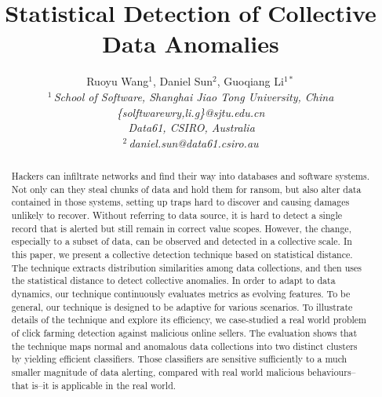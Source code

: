 \documentclass[10pt,conference,letterpaper]{IEEEtran}
\title{Statistical Detection of Collective Data Anomalies}
\author{%
	{Ruoyu Wang{\small$^{1}$}, Daniel Sun{\small$^{2}$}, Guoqiang Li{\small$^{1*}$} }%
	\vspace{1.6mm}\\
	\fontsize{10}{10}\selectfont\itshape
	$^{1}$\,School of Software, Shanghai Jiao Tong University, China\\
	\fontsize{9}{9}\selectfont\ttfamily\upshape
	\{solftwarewry,li.g\}@sjtu.edu.cn
	\vspace{1.2mm}\\
	\fontsize{10}{10}\selectfont\rmfamily\itshape
	\,Data61, CSIRO, Australia\\
	\fontsize{9}{9}\selectfont\ttfamily\upshape
	$^{2}$\,daniel.sun@data61.csiro.au
}
\begin{document}
\maketitle
%
	\begin{abstract} 
		Hackers can infiltrate networks and find their way into databases and software systems. Not only
		can they steal chunks of data and hold them for ransom, but
		also alter data contained in those systems, setting up
		traps hard to discover and causing damages unlikely to recover.
		Without referring to data source, it is hard to detect a single record that is alerted but still remain in correct value scopes. However, the change, especially to a subset of data, can be observed and detected in a collective scale. 
		In this paper, we present a collective
		detection technique based on statistical distance. The technique
		extracts distribution similarities among data collections, and then uses the statistical distance to detect
		collective anomalies. In order to adapt to data dynamics, our technique continuously evaluates 
		metrics as evolving features. To be general, our
		technique is designed to be adaptive for various scenarios. To illustrate details of the technique
		and explore its efficiency, we case-studied a real
		world problem of click farming detection against malicious online
		sellers. The evaluation shows that the technique maps normal
		and anomalous data collections into two distinct clusters by yielding
		efficient classifiers. Those classifiers are sensitive sufficiently to
		a much smaller magnitude of data alerting, compared with real
		world malicious behaviours--that is--it is applicable in the real world. 
	\end{abstract}

%
\end{document}
